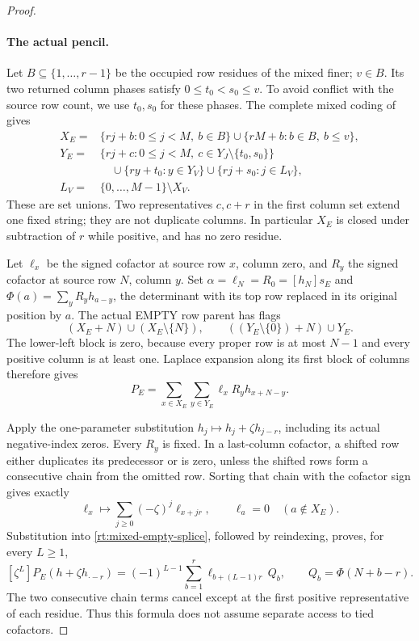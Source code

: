 \documentclass[11pt,a4paper]{amsart}
\numberwithin{equation}{section}
\theoremstyle{plain}
\theoremstyle{definition}
\begin{document}
\begin{proof}
\paragraph{The actual pencil.}
Let \(B\subseteq\{1,\ldots,r-1\}\) be the occupied row residues of
the mixed finer; \(v\in B\).  Its two returned column phases satisfy
\(0\le t_0<s_0\le v\).  To avoid conflict with the source row count,
we use \(t_0,s_0\) for these phases.  The complete mixed coding of
\cite[Boundary coding lemma]{Shields2026Gluing} gives
\begin{equation}\label{rt:mixed-empty-flags}
 \begin{split}
 X_E={}&\{rj+b:0\le j<M,\ b\in B\}
        \cup\{rM+b:b\in B,\ b\le v\},\\
 Y_E={}&\{rj+c:0\le j<M,\ c\in Y_J\setminus\{t_0,s_0\}\}\\
       &\quad\cup\{ry+t_0:y\in Y_V\}
         \cup\{rj+s_0:j\in L_V\},\\
 L_V={}&\{0,\ldots,M-1\}\setminus X_V .
 \end{split}
\end{equation}
These are set unions.  Two representatives \(c,c+r\) in the first
column set extend one fixed string; they are not duplicate columns.
In particular \(X_E\) is closed under subtraction of \(r\) while
positive, and has no zero residue.

Let \(\ell_x\) be the signed cofactor at source row \(x\), column zero,
and \(R_y\) the signed cofactor at source row \(N\), column \(y\).
Set \(\alpha=\ell_N=R_0=[h_N]s_E\) and
\(\Phi(a)=\sum_yR_yh_{a-y}\), the determinant with its top row
replaced in its original position by \(a\).  The actual EMPTY row
parent has flags
\[
 (X_E+N)\cup(X_E\setminus\{N\}),\qquad
 ((Y_E\setminus\{0\})+N)\cup Y_E .
\]
The lower-left block is zero, because every proper row is at most
\(N-1\) and every positive column is at least one.  Laplace expansion
along its first block of columns therefore gives
\begin{equation}\label{rt:mixed-empty-splice}
 P_E=\sum_{x\in X_E}\sum_{y\in Y_E}\ell_xR_yh_{x+N-y}.
\end{equation}

Apply the one-parameter substitution
\(h_j\mapsto h_j+\zeta h_{j-r}\), including its actual negative-index
zeros.  Every \(R_y\) is fixed.  In a last-column cofactor, a shifted
row either duplicates its predecessor or is zero, unless the shifted
rows form a consecutive chain from the omitted row.  Sorting that
chain with the cofactor sign gives exactly
\[
 \ell_x\longmapsto\sum_{j\ge0}(-\zeta)^j\ell_{x+jr},
 \qquad \ell_a=0\quad(a\notin X_E).
\]
Substitution into \eqref{rt:mixed-empty-splice}, followed by reindexing,
proves, for every \(L\ge1\),
\begin{equation}\label{rt:mixed-empty-pencil}
 [\zeta^L]P_E(h+\zeta h_{\cdot-r})
   =(-1)^{L-1}\sum_{b=1}^{r}
       \ell_{b+(L-1)r}\,Q_b,\qquad
 Q_b=\Phi(N+b-r).
\end{equation}
The two consecutive chain terms cancel except at the first positive
representative of each residue.  Thus this formula does not assume
separate access to tied cofactors.


\end{proof}
\end{document}
